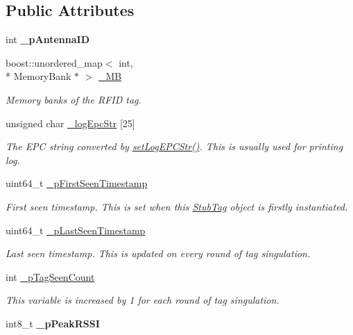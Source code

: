 \subsection*{Public Attributes}
\begin{DoxyCompactItemize}
\item 
\hypertarget{class_e_l_f_i_n_1_1_stub_tag_a83854c71722dce2d2688d4b674345a0c}{int {\bfseries \-\_\-p\-Antenna\-I\-D}}\label{class_e_l_f_i_n_1_1_stub_tag_a83854c71722dce2d2688d4b674345a0c}

\item 
boost\-::unordered\-\_\-map$<$ int, \\*
Memory\-Bank $\ast$ $>$ \hyperlink{class_e_l_f_i_n_1_1_stub_tag_aaf9799b7628bb9e7e809f4b1170e8860}{\-\_\-\-M\-B}
\begin{DoxyCompactList}\small\item\em Memory banks of the R\-F\-I\-D tag. \end{DoxyCompactList}\item 
unsigned char \hyperlink{class_e_l_f_i_n_1_1_stub_tag_ad548fb36934243beeb9abd78bf798950}{\-\_\-log\-Epc\-Str} \mbox{[}25\mbox{]}
\begin{DoxyCompactList}\small\item\em The E\-P\-C string converted by \hyperlink{class_e_l_f_i_n_1_1_stub_tag_a723f6fd0f93be388fc3e33e421971602}{set\-Log\-E\-P\-C\-Str()}. This is usually used for printing log. \end{DoxyCompactList}\item 
uint64\-\_\-t \hyperlink{class_e_l_f_i_n_1_1_stub_tag_a64dca615c8a707c471a18603d1571827}{\-\_\-p\-First\-Seen\-Timestamp}
\begin{DoxyCompactList}\small\item\em First seen timestamp. This is set when this \hyperlink{class_e_l_f_i_n_1_1_stub_tag}{Stub\-Tag} object is firstly instantiated. \end{DoxyCompactList}\item 
uint64\-\_\-t \hyperlink{class_e_l_f_i_n_1_1_stub_tag_aaacdb107e2932c933da9614fb720dd38}{\-\_\-p\-Last\-Seen\-Timestamp}
\begin{DoxyCompactList}\small\item\em Last seen timestamp. This is updated on every round of tag singulation. \end{DoxyCompactList}\item 
int \hyperlink{class_e_l_f_i_n_1_1_stub_tag_aaad01b7bf25e718764daf86a4ed36942}{\-\_\-p\-Tag\-Seen\-Count}
\begin{DoxyCompactList}\small\item\em This variable is increased by 1 for each round of tag singulation. \end{DoxyCompactList}\item 
\hypertarget{class_e_l_f_i_n_1_1_stub_tag_a9b60ca1dc3bc6881f73f20bc98ade351}{int8\-\_\-t {\bfseries \-\_\-p\-Peak\-R\-S\-S\-I}}\label{class_e_l_f_i_n_1_1_stub_tag_a9b60ca1dc3bc6881f73f20bc98ade351}


\end{DoxyCompactItemize}
